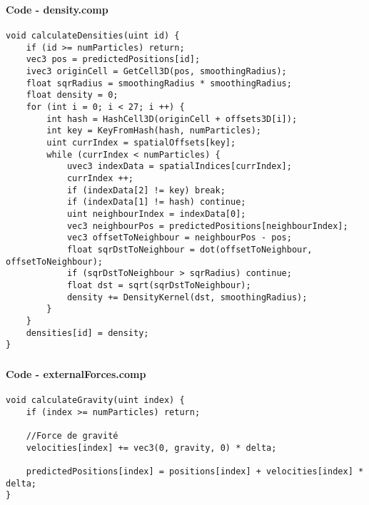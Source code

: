 \begin{frame}[fragile]
    \frametitle{\anxpti}
    \framesubtitle{Code - density.comp}

    \begin{verbatim}
void calculateDensities(uint id) {
    if (id >= numParticles) return;
    vec3 pos = predictedPositions[id];
    ivec3 originCell = GetCell3D(pos, smoothingRadius);
    float sqrRadius = smoothingRadius * smoothingRadius;
    float density = 0;
    for (int i = 0; i < 27; i ++) {
        int hash = HashCell3D(originCell + offsets3D[i]);
        int key = KeyFromHash(hash, numParticles);
        uint currIndex = spatialOffsets[key];
        while (currIndex < numParticles) {
            uvec3 indexData = spatialIndices[currIndex];
            currIndex ++;
            if (indexData[2] != key) break;
            if (indexData[1] != hash) continue;
            uint neighbourIndex = indexData[0];
            vec3 neighbourPos = predictedPositions[neighbourIndex];
            vec3 offsetToNeighbour = neighbourPos - pos;
            float sqrDstToNeighbour = dot(offsetToNeighbour, offsetToNeighbour);
            if (sqrDstToNeighbour > sqrRadius) continue;
            float dst = sqrt(sqrDstToNeighbour);
            density += DensityKernel(dst, smoothingRadius);
        }
    }
    densities[id] = density;
}
    \end{verbatim}
\end{frame}

\begin{frame}[fragile]
    \frametitle{\anxpti}
    \framesubtitle{Code - externalForces.comp}

    \begin{verbatim}
void calculateGravity(uint index) {
    if (index >= numParticles) return;

    //Force de gravité
    velocities[index] += vec3(0, gravity, 0) * delta;

    predictedPositions[index] = positions[index] + velocities[index] * delta;
}
    \end{verbatim}
\end{frame}


